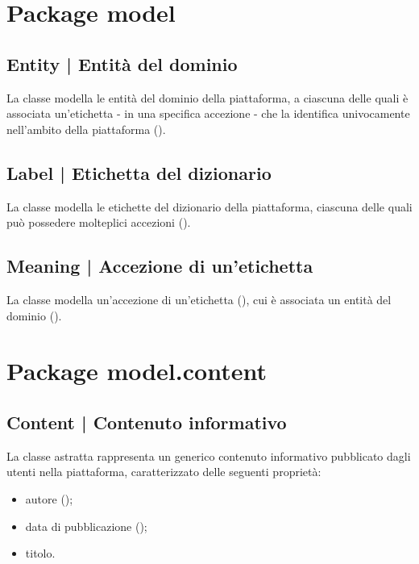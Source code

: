 \documentclass[10pt,a4paper,headinclude,footinclude,hidelinks]{scrreprt} %
\begin{document}
	\section{Package model}
	\label{sec:stage:design:sistema:model}

	\subsection[Entity]{Entity | Entità del dominio}
	\label{sec:stage:design:sistema:model:entity}
	La classe modella le entità del dominio della piattaforma, a ciascuna delle quali è associata un'etichetta - in una specifica accezione - che la identifica univocamente nell'ambito della piattaforma (\textit{}).

	\subsection[Label]{Label | Etichetta del dizionario}
	\label{sec:stage:design:sistema:model:label}
	La classe modella le etichette del dizionario della piattaforma, ciascuna delle quali può possedere molteplici accezioni (\textit{}).

	\subsection[Meaning]{Meaning | Accezione di un'etichetta}
	\label{sec:stage:design:sistema:model:meaning}
	La classe modella un'accezione di un'etichetta (\textit{}), cui è associata un entità del dominio (\textit{}).

	\section{Package model.content}
	\label{sec:stage:design:sistema:model.content}

	\subsection[Content]{Content | Contenuto informativo}
	\label{sec:stage:design:sistema:model.content:content}
	La classe astratta rappresenta un generico contenuto informativo pubblicato dagli utenti nella piattaforma, caratterizzato delle seguenti proprietà:
	\begin{itemize}
	\item autore (\textit{});
	\item data di pubblicazione (\textit{});
	\item titolo.
	\end{itemize}
\end{document}
